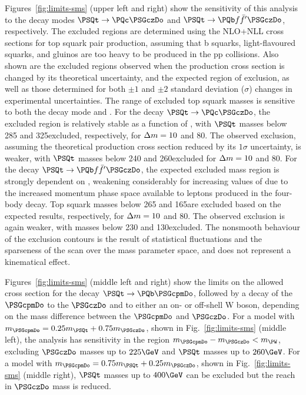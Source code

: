 Figures~\ref{fig:limits-sms} (upper left and right) show the
sensitivity of this analysis to the decay modes $\PSQt \to
\PQc\PSGczDo$ and $\PSQt \to\PQb \ffbp \PSGczDo$, respectively.  The
excluded regions are determined using the NLO+NLL cross sections for
top squark pair production, assuming that b squarks, light-flavoured
squarks, and gluinos are too heavy to be produced in the pp
collisions. Also shown are the excluded regions observed when the
production cross section is changed by its theoretical uncertainty,
and the expected region of exclusion, as well as those determined for
both ${\pm}1$ and ${\pm}2$ standard deviation ($\sigma$) changes in
experimental uncertainties. The range of excluded top squark masses is
sensitive to both the decay mode and \dm. For the decay $\PSQt
\to\PQc\PSGczDo$, the excluded region is relatively stable as a
function of \dm, with $\PSQt$ masses below 285 and 325\GeV excluded,
respectively, for $\Delta m = 10$ and 80\GeV. The observed exclusion,
assuming the theoretical production cross section reduced by its
$1\sigma$ uncertainty, is weaker, with $\PSQt$ masses below 240 and
260\GeV excluded for $\Delta m = 10$ and 80\GeV. For the decay $\PSQt
\to\PQb \ffbp \PSGczDo$, the expected excluded mass region is strongly
dependent on \dm, weakening considerably for increasing values of \dm
due to the increased momentum phase space available to leptons
produced in the four-body decay. Top squark masses below 265 and
165\GeV are excluded based on the expected results, respectively, for
$\Delta m = 10$ and 80\GeV. The observed exclusion is again weaker, with
masses below 230 and 130\GeV excluded. The nonsmooth behaviour of the
exclusion contours is the result of statistical fluctuations and the
sparseness of the scan over the mass parameter space, and does not
represent a kinematical effect.

Figures~\ref{fig:limits-sms} (middle left and right) show the limits
on the allowed cross section for the decay $\PSQt \to \PQb \PSGcpmDo$,
followed by a decay of the $\PSGcpmDo$ to the $\PSGczDo$ and to either
an on- or off-shell W boson, depending on the mass difference between
the $\PSGcpmDo$ and $\PSGczDo$.  For a model with $m_{\PSGcpmDo} =
0.25m_{\PSQt} + 0.75m_{\PSGczDo}$, shown in Fig.~\ref{fig:limits-sms}
(middle left), the analysis has sensitivity in the region
$m_{\PSGcpmDo} - m_{\PSGczDo} < m_{\PW}$, excluding $\PSGczDo$ masses
up to $225 \GeV$ and $\PSQt$ masses up to $260 \GeV$. For a model with
$m_{\PSGcpmDo} = 0.75m_{\PSQt} + 0.25m_{\PSGczDo}$, shown in
Fig.~\ref{fig:limits-sms} (middle right), $\PSQt$ masses up to $400
\GeV$ can be excluded but the reach in $\PSGczDo$ mass is reduced.

